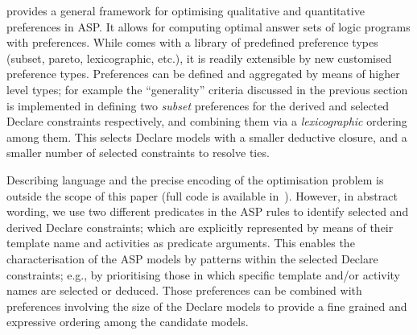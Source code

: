 \asprin provides a general framework for optimising qualitative and quantitative preferences in ASP. It allows for computing optimal answer sets of logic programs with preferences. While \asprin comes with a library of predefined preference types (subset, pareto, lexicographic, etc.), it is readily extensible by new customised preference types. Preferences can be defined and aggregated by means of higher level types; for example the ``generality'' criteria discussed in the previous section is implemented in \asprin defining two \emph{subset} preferences for the derived and selected Declare constraints respectively, and combining them via a \emph{lexicographic} ordering among them. This selects Declare models with a smaller deductive closure, and a smaller number of selected constraints to resolve ties.

Describing \asprin language and the precise encoding of the optimisation problem is outside the scope of this paper (full code is available in~\cite{zenodo:experiments}). However, in abstract wording, we use two different predicates in the ASP rules to identify selected and derived Declare constraints; which are explicitly represented by means of their template name and activities as predicate arguments.
%
This enables the characterisation of the ASP models by patterns within the selected Declare constraints; e.g., by prioritising those in which specific template and/or activity names are selected or deduced. Those preferences can be combined with preferences involving the size of the Declare models to provide a fine grained and expressive ordering among the candidate models.

